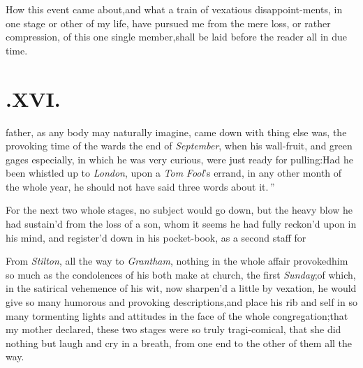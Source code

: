 \documentclass{article}
\begin{document}
How this event came about,\tsk  and what a train of vexatious
disappoint-\break ments, in one stage or other of my life, have pursued me
from the mere loss, or rather compression, of this one single
member,\tsk  shall be laid before the reader all in due time.

\section{.\enspace XVI.}

 father, as any body may naturally imagine, came down with\break
{} 
 thing else was, the provoking time of the
 wards the end of
\textit{September}, when his wall-fruit, and green gages especially, in which he was
very curious, were just ready for pulling:\tsh \lqq Had he been\break
\lqq whistled up to \textit{London}, upon a \textit{Tom}\break
\lqq \textit{Fool}’s errand, in any other month of\break
\lqq the whole year, he should not have\break
\lqq said three words about it.\,”

For the next two whole stages, no\break
subject would go down, but the heavy blow he
had sustain’d from the loss of a son, whom it seems he had fully
reckon’d upon in his mind, and register’d down in his pocket-book,
as a second staff for\break
{}

From \textit{Stilton}, all the way to \textit{Grantham}, nothing in
the whole affair provoked\break him so much as the condolences of his
both make at church,
the first \textit{Sunday};\break\tsk of which, in the satirical
vehemence of his wit, now sharpen’d a little by vexation, he
would give so many humorous and provoking descriptions,\tsk  and
place his rib and self in so many tormenting lights and attitudes
in the face of the whole congregation;\tsk  that my mother
declared, these two stages were so truly tragi-comical, that she
did nothing but laugh and cry in a breath, from one end to the
other of them all the way.
\end{document}
